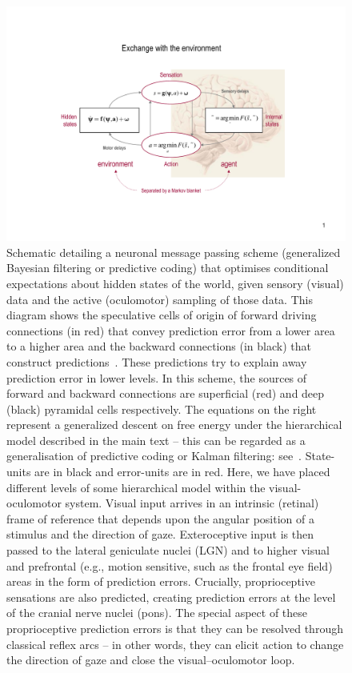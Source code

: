 \documentclass[a4paper]{article} %
\begin{document}
\begin{figure}%
\centerline{%
\includegraphics[width=\columnwidth, clip, trim = 2.3cm 2cm 1.1cm 1.2cm, page=2]{Figures_slides.pdf}  
}%
\caption{Schematic detailing a neuronal message passing scheme
(generalized Bayesian filtering or predictive coding) that optimises
conditional expectations about hidden states of the world, given sensory
(visual) data and the active (oculomotor) sampling of those data. This
diagram shows the speculative cells of origin of forward driving
connections (in red) that convey prediction error from a lower area to a
higher area and the backward connections (in black) that construct
predictions~\citep{Mumford92}. These predictions try to explain away
prediction error in lower levels. In this scheme, the sources of forward
and backward connections are superficial (red) and deep (black)
pyramidal cells respectively. The equations on the right represent a
generalized descent on free energy under the hierarchical model
described in the main text -- this can be regarded as a generalisation
of predictive coding or Kalman filtering: see~\citep{Friston08b}.
State-units are in black and error-units are in red. Here, we have
placed different levels of some hierarchical model within the
visual-oculomotor system. Visual input arrives in an intrinsic (retinal)
frame of reference that depends upon the angular position of a stimulus
and the direction of gaze. Exteroceptive input is then passed to the
lateral geniculate nuclei (LGN) and to higher visual and prefrontal
(e.g., motion sensitive, such as the frontal eye field) areas in the
form of prediction errors. Crucially, proprioceptive sensations are also
predicted, creating prediction errors at the level of the cranial nerve
nuclei (pons). The special aspect of these proprioceptive prediction
errors is that they can be resolved through classical reflex arcs -- in
other words, they can elicit action to change the direction of gaze and
close the visual--oculomotor loop.}%
\label{fig:figure2}
\end{figure}
\end{document}
